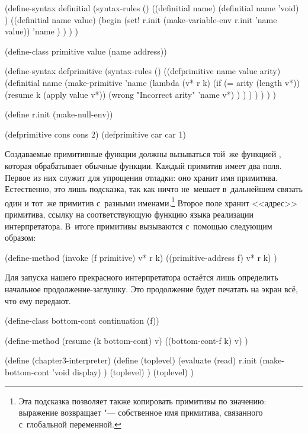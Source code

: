 \begin{code:lisp}
(define-syntax definitial
  (syntax-rules ()
    ((definitial name)
     (definitial name 'void) )
    ((definitial name value)
     (begin (set! r.init (make-variable-env r.init 'name value))
            'name ) ) ) )

(define-class primitive value (name address))

(define-syntax defprimitive
  (syntax-rules ()
    ((defprimitive name value arity)
     (definitial name
       (make-primitive
        'name (lambda (v* r k)
                (if (= arity (length v*))
                    (resume k (apply value v*))
                    (wrong "Incorrect arity" 'name v*) ) ) ) ) ) ) )

(define r.init (make-null-env))

(defprimitive cons cons 2)
(defprimitive car car 1)
\end{code:lisp}

Создаваемые примитивные функции должны вызываться той~же функцией ,
которая обрабатывает обычные функции. Каждый примитив имеет два поля. Первое из
них служит для упрощения отладки: оно хранит имя примитива. Естественно, это
лишь подсказка, так как ничто не~мешает в~дальнейшем связать один и тот~же
примитив с~разными именами.\footnote*{Эта подсказка позволяет также копировать
примитивы по значению: выражение 
возвращает  "--- собственное имя примитива, связанного с~глобальной
переменной.} Второе поле хранит <<адрес>> примитива, ссылку на соответствующую
функцию языка реализации интерпретатора. В~итоге примитивы вызываются с~помощью
 следующим образом:

\begin{code:lisp}
(define-method (invoke (f primitive) v* r k)
  ((primitive-address f) v* r k) )
\end{code:lisp}

Для запуска нашего прекрасного интерпретатора остаётся лишь определить начальное
продолжение-заглушку. Это продолжение будет печатать на экран всё, что ему
передают.

\begin{code:lisp}
(define-class bottom-cont continuation (f))

(define-method (resume (k bottom-cont) v)
  ((bottom-cont-f k) v) )

(define (chapter3-interpreter)
  (define (toplevel)
    (evaluate (read)
              r.init
              (make-bottom-cont 'void display) )
    (toplevel) )
  (toplevel) )
\end{code:lisp}

